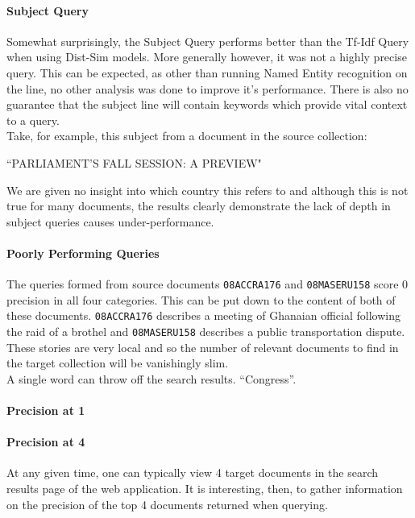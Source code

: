 \documentclass{l4proj}
\newcommand{\code}[1]{\texttt{#1}}
\begin{document}
\paragraph{Subject Query}
Somewhat surprisingly, the Subject Query performs better than the Tf-Idf Query when using Dist-Sim models. More generally however, it was not a highly precise query.  This can be expected, as other than running Named Entity recognition on the line, no other analysis was done to improve it's performance. There is also no guarantee that the subject line will contain keywords which provide vital context to a query.\\
Take, for example, this subject from a document in the source collection:
\begin{center}``PARLIAMENT'S FALL SESSION: A PREVIEW"\end{center}
We are given no insight into which country this refers to and although this is not true for many documents, the results clearly demonstrate the lack of depth in subject queries causes under-performance.\\
\paragraph{Poorly Performing Queries}
The queries formed from source documents \code{08ACCRA176} and \code{08MASERU158} score 0 precision in all four categories. This can be put down to the content of both of these documents. \code{08ACCRA176} describes a meeting of Ghanaian official following the raid of a brothel and \code{08MASERU158} describes a public transportation dispute. These stories are very local and so the number of relevant documents to find in the target collection will be vanishingly slim. \\
A single word can throw off the search results. ``Congress''. \\
\paragraph{Precision at 1}
\paragraph{Precision at 4}
At any given time, one can typically view 4 target documents in the search results page of the web application. It is interesting, then, to gather information on the precision of the top 4 documents returned when querying.
\end{document}

